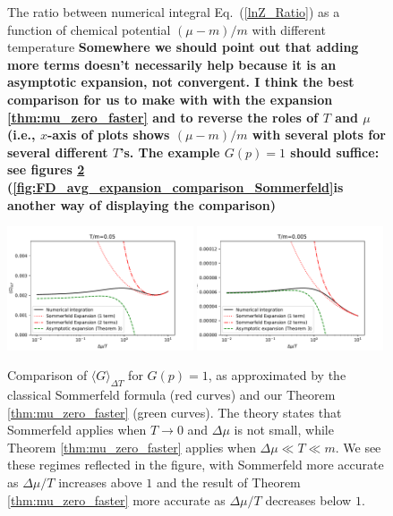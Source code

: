 \documentclass[sn-mathphys,Numbered]{sn-jnl}
\begin{document}
\begin{figure}[t]
\caption{ The ratio between numerical integral Eq.~(\ref{lnZ_Ratio}) as a function of chemical potential $(\mu-m)/m$ with different temperature  {\bf Somewhere we should point out that adding more terms doesn't necessarily help because it is an asymptotic expansion, not convergent.  I think the best comparison for us to make with with the expansion \eqref{thm:mu_zero_faster} and to reverse the roles of $T$ and $\mu$ (i.e., $x$-axis of plots shows $(\mu-m)/m$ with several plots for several different $T$'s. The example $G(p)=1$ should suffice: see figures \ref{fig:Thm3_vs_Sommerfeld_comparison_fixed_T} (\ref{fig:FD_avg_expansion_comparison_Sommerfeld}is another way of displaying the comparison) }}
\label{lnZ_Ratio_fig}
\end{figure}
\begin{figure}
\centering
\includegraphics[width=0.49\textwidth]{./plot/Thm3_vs_Sommerfeld_comparison_T_0.05m.pdf}
\includegraphics[width=0.49\textwidth]{./plot/Thm3_vs_Sommerfeld_comparison_T_0.005m.pdf}
\caption{Comparison of $\langle G\rangle_{\Delta T}$ for $G(p)=1$, as approximated by the classical Sommerfeld formula (red curves) and our Theorem \ref{thm:mu_zero_faster} (green curves).  The theory states that Sommerfeld applies when $T\to 0$ and $\Delta\mu$ is not small, while Theorem \ref{thm:mu_zero_faster} applies when $\Delta\mu\ll T\ll m$. We see these regimes reflected in the figure, with Sommerfeld more accurate as $\Delta\mu/T$ increases above $1$ and the result of Theorem \ref{thm:mu_zero_faster} more accurate as $\Delta\mu/T$ decreases below $1$.}\label{fig:Thm3_vs_Sommerfeld_comparison_fixed_T}
\end{figure}
\end{document}

